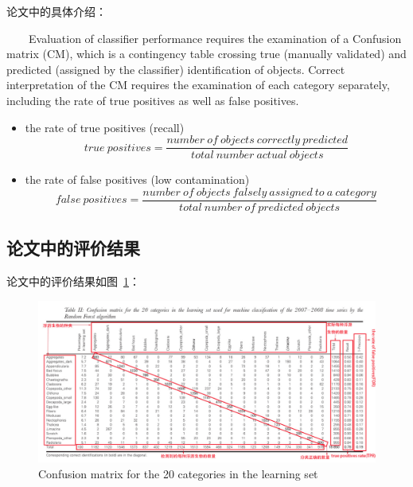 \documentclass[12pt]{article}
\begin{document}
论文中的具体介绍：
\begin{tcolorbox}[colback=red!5,colframe=blue!75!black]
~~~~Evaluation of classifier performance requires the examination of a {\color{blue}Confusion matrix (CM)}, which is a contingency table crossing true (manually validated) and predicted (assigned by the classifier) identification of objects. Correct interpretation of the CM requires the examination of each category separately, including {\color{blue}the rate of true positives} as well as {\color{blue}false positives}.
\begin{itemize}
    \item the rate of true positives (recall)
        \begin{displaymath}
            true~positives=\frac{number~of~objects~correctly~predicted}{total~number~actual~objects}
        \end{displaymath}
    \item the rate of false positives (low contamination)
        \begin{displaymath}
            false~positives=\frac{number~of~objects~falsely~assigned~to~a~category}{total~number~of~predicted~objects}
        \end{displaymath}
\end{itemize}
\end{tcolorbox}

\subsection{论文中的评价结果}
论文中的评价结果如图~\ref{fig:cmlearn}：
    \begin{figure}[!ht]
      \centering 
        \includegraphics[width=1\textwidth]{cmlearn}
        \caption{Confusion matrix for the 20 categories in the learning set}
        \label{fig:cmlearn}
    \end{figure}
\end{document}
